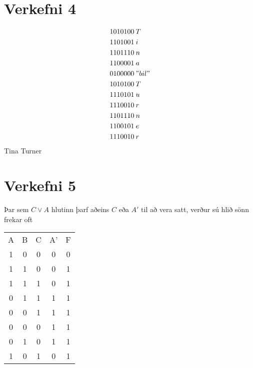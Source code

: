 \documentclass{article}
\begin{document}
\section*{Verkefni 4}
\begin{align*}
    1010100\:&  T\\
    1101001\:&  i\\
    1101110\:&  n\\
    1100001\:&  a\\
    0100000\:&  "bil" \\
    1010100\:&  T\\
    1110101\:&  u\\
    1110010\:&  r\\
    1101110\:&  n\\
    1100101\:&  e\\
    1110010\:&  r
\end{align*}
Tina Turner

\newpage
\section*{Verkefni 5}
Þar sem $C\lor A$ hlutinn þarf aðeins $C$ eða $A'$ til að vera satt, verður sú hlið sönn frekar oft
\begin{center}
    \begin{tabular}{|c|c|c|c|c|}
        \hline
        A & B & C & A' & F\\
        1 & 0 & 0 & 0 & 0\\
        1 & 1 & 0 & 0 & 1\\
        1 & 1 & 1 & 0 & 1\\
        0 & 1 & 1 & 1 & 1\\
        0 & 0 & 1 & 1 & 1\\
        0 & 0 & 0 & 1 & 1\\
        0 & 1 & 0 & 1 & 1\\
        1 & 0 & 1 & 0 & 1\\
        \hline
    \end{tabular}
\end{center}
\end{document}
